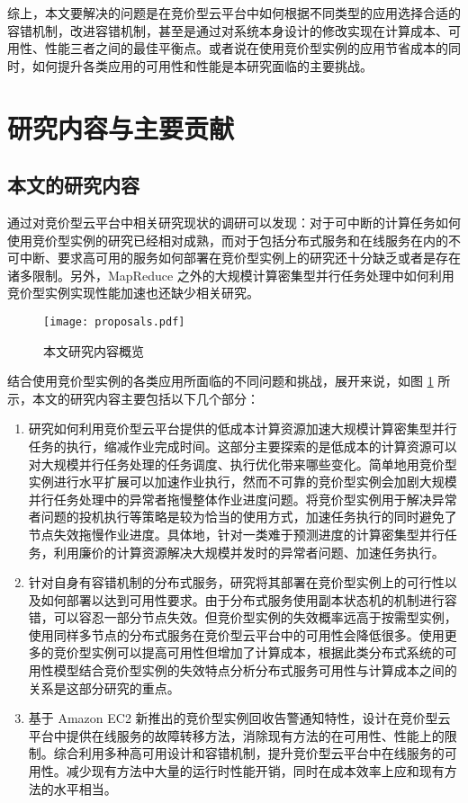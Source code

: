 综上，本文要解决的问题是在竞价型云平台中如何根据不同类型的应用选择合适的容错机制，改进容错机制，甚至是通过对系统本身设计的修改实现在计算成本、可用性、性能三者之间的最佳平衡点。或者说在使用竞价型实例的应用节省成本的同时，如何提升各类应用的可用性和性能是本研究面临的主要挑战。

\section{研究内容与主要贡献}
\subsection{本文的研究内容}
通过对竞价型云平台中相关研究现状的调研可以发现：对于可中断的计算任务如何使用竞价型实例的研究已经相对成熟，而对于包括分布式服务和在线服务在内的不可中断、要求高可用的服务如何部署在竞价型实例上的研究还十分缺乏或者是存在诸多限制。另外，MapReduce 之外的大规模计算密集型并行任务处理中如何利用竞价型实例实现性能加速也还缺少相关研究。
\begin{figure}
  \centering
  \texttt{[image: proposals.pdf]}
  \caption{本文研究内容概览}
  \label{figure:research_proposals}
\end{figure}

结合使用竞价型实例的各类应用所面临的不同问题和挑战，展开来说，如图 \ref{figure:research_proposals} 所示，本文的研究内容主要包括以下几个部分：
\begin{enumerate}
\item 研究如何利用竞价型云平台提供的低成本计算资源加速大规模计算密集型并行任务的执行，缩减作业完成时间。这部分主要探索的是低成本的计算资源可以对大规模并行任务处理的任务调度、执行优化带来哪些变化。简单地用竞价型实例进行水平扩展可以加速作业执行，然而不可靠的竞价型实例会加剧大规模并行任务处理中的异常者拖慢整体作业进度问题。将竞价型实例用于解决异常者问题的投机执行等策略是较为恰当的使用方式，加速任务执行的同时避免了节点失效拖慢作业进度。具体地，针对一类难于预测进度的计算密集型并行任务，利用廉价的计算资源解决大规模并发时的异常者问题、加速任务执行。
\item 针对自身有容错机制的分布式服务，研究将其部署在竞价型实例上的可行性以及如何部署以达到可用性要求。由于分布式服务使用副本状态机的机制进行容错，可以容忍一部分节点失效。但竞价型实例的失效概率远高于按需型实例，使用同样多节点的分布式服务在竞价型云平台中的可用性会降低很多。使用更多的竞价型实例可以提高可用性但增加了计算成本，根据此类分布式系统的可用性模型结合竞价型实例的失效特点分析分布式服务可用性与计算成本之间的关系是这部分研究的重点。
\item 基于 Amazon EC2 新推出的竞价型实例回收告警通知特性，设计在竞价型云平台中提供在线服务的故障转移方法，消除现有方法的在可用性、性能上的限制。综合利用多种高可用设计和容错机制，提升竞价型云平台中在线服务的可用性。减少现有方法中大量的运行时性能开销，同时在成本效率上应和现有方法的水平相当。
\end{enumerate}

